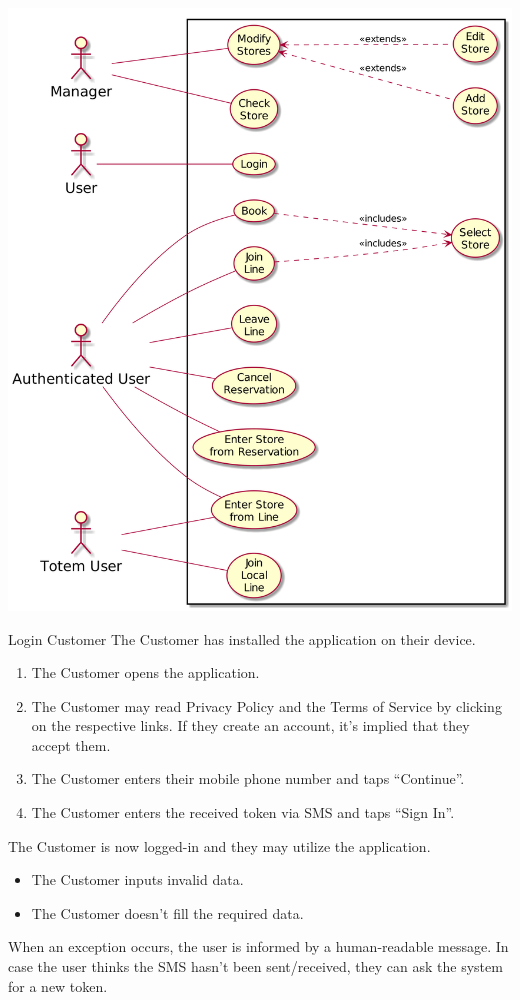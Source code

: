 \begin{center}
    \includegraphics[width=\textwidth]{uml/usecase.png}
\end{center}



\usecase
{Login}
{Customer}
{The Customer has installed the application on their device.}
{
    \begin{enumerate}
        \item The Customer opens the application.
        \item The Customer may read Privacy Policy and the Terms of Service by clicking on the respective links. If they create an account, it's implied that they accept them.
        \item The Customer enters their mobile phone number and taps ``Continue''.
        \item The Customer enters the received token via SMS and taps ``Sign In''.
    \end{enumerate}
}
{The Customer is now logged-in and they may utilize the application.}
{
    \begin{itemize}
        \item The Customer inputs invalid data.
        \item The Customer doesn't fill the required data.
    \end{itemize}
}
{
    When an exception occurs, the user is informed by a human-readable message.
    In case the user thinks the SMS hasn't been sent/received, they can ask the system for a new token.
}

